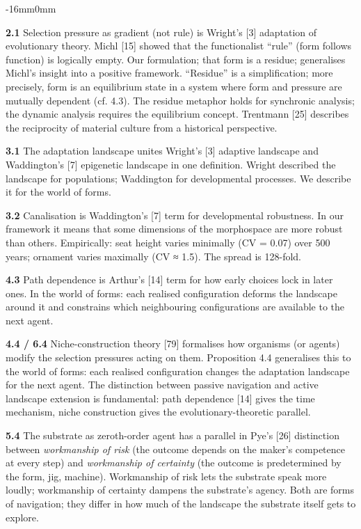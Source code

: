\documentclass[10pt,oneside]{book}
\newcommand{\msym}[1]{{\mathfbfont #1}}
\newenvironment{widebody}{%
  \begin{adjustwidth}{-16mm}{0mm}%
}{%
  \end{adjustwidth}%
}
\begin{document}
\begin{widebody}
{\textbf{2.1} Selection pressure as gradient (not rule) is Wright's [3] adaptation of evolutionary theory. Michl [15] showed that the functionalist ``rule'' (form follows function) is logically empty. Our formulation; that form is a residue; generalises Michl's insight into a positive framework. ``Residue'' is a simplification; more precisely, form is an equilibrium state in a system where form and pressure are mutually dependent (cf. 4.3). The residue metaphor holds for synchronic analysis; the dynamic analysis requires the equilibrium concept. Trentmann [25] describes the reciprocity of material culture from a historical perspective.

\textbf{3.1} The adaptation landscape unites Wright's [3] adaptive landscape and Waddington's [7] epigenetic landscape in one definition. Wright described the landscape for populations; Waddington for developmental processes. We describe it for the world of forms.

\textbf{3.2} Canalisation is Waddington's [7] term for developmental robustness. In our framework it means that some dimensions of the morphospace are more robust than others. Empirically: seat height varies minimally (CV = 0.07) over 500 years; ornament varies maximally (CV \msym{≈} 1.5). The spread is 128-fold.

\textbf{4.3} Path dependence is Arthur's [14] term for how early choices lock in later ones. In the world of forms: each realised configuration deforms the landscape around it and constrains which neighbouring configurations are available to the next agent.

\textbf{4.4 / 6.4} Niche-construction theory [79] formalises how organisms (or agents) modify the selection pressures acting on them. Proposition 4.4 generalises this to the world of forms: each realised configuration changes the adaptation landscape for the next agent. The distinction between passive navigation and active landscape extension is fundamental: path dependence [14] gives the time mechanism, niche construction gives the evolutionary-theoretic parallel.

\textbf{5.4} The substrate as zeroth-order agent has a parallel in Pye's [26] distinction between \textit{workmanship of risk} (the outcome depends on the maker's competence at every step) and \textit{workmanship of certainty} (the outcome is predetermined by the form, jig, machine). Workmanship of risk lets the substrate speak more loudly; workmanship of certainty dampens the substrate's agency. Both are forms of navigation; they differ in how much of the landscape the substrate itself gets to explore.

}
\end{widebody}
\end{document}
